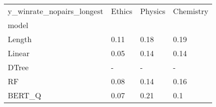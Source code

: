 \begin{tabular}{llll}
\toprule
y\_winrate\_nopairs\_longest & Ethics & Physics & Chemistry \\
model  &        &         &           \\
\midrule
Length &   0.11 &    0.18 &      0.19 \\
Linear &   0.05 &    0.14 &      0.14 \\
DTree  &      - &       - &         - \\
RF     &   0.08 &    0.14 &      0.16 \\
BERT\_Q &   0.07 &    0.21 &       0.1 \\
\bottomrule
\end{tabular}
